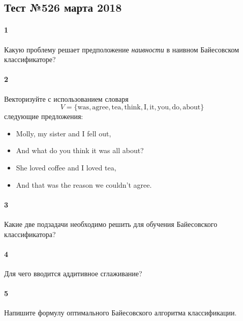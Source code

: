 \documentclass[a4paper,12pt]{article}
\begin{document}
  \subsection*{Тест №5\hfill{26 марта 2018}}

  \paragraph{1} Какую проблему решает предположение \emph{наивности} в наивном
  Байесовском классификаторе?
  
  \makebox[\linewidth]{\hrulefill}
  \makebox[\linewidth]{\hrulefill}
  \makebox[\linewidth]{\hrulefill}  
  \makebox[\linewidth]{\hrulefill}
    
  \paragraph{2} Векторизуйте с использованием словаря
  $$
  V = \{\text{was}, \text{agree}, \text{tea}, \text{think},
        \text{I}, \text{it}, \text{you}, \text{do}, \text{about}\}
  $$
  следующие предложения:
  \begin{itemize}
  \item Molly, my sister and I fell out,
  \item And what do you think it was all about?
  \item She loved coffee and I loved tea,
  \item And that was the reason we couldn't agree.
  \end{itemize}

  \paragraph{3} Какие две подзадачи необходимо решить для обучения Байесовского
  классификатора?

  \makebox[\linewidth]{\hrulefill}
  \makebox[\linewidth]{\hrulefill}
  \makebox[\linewidth]{\hrulefill}
  \makebox[\linewidth]{\hrulefill}

  \paragraph{4} Для чего вводится аддитивное сглаживание?

  
  \makebox[\linewidth]{\hrulefill}
  \makebox[\linewidth]{\hrulefill}
  \makebox[\linewidth]{\hrulefill}
  
  \paragraph{5} Напишите формулу оптимального Байесовского алгоритма классификации.

  \makebox[\linewidth]{\hrulefill}
  \makebox[\linewidth]{\hrulefill}
  \makebox[\linewidth]{\hrulefill}
  \makebox[\linewidth]{\hrulefill}
  
\end{document}
